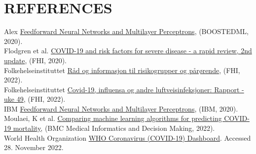 \documentclass[english,notitlepage,reprint,nofootinbib]{revtex4-1}  %
\begin{document}
\section{REFERENCES}\label{sec: REF}
Alex 
\href{https://boostedml.com/2020/04/feedforward-neural-networks-and-multilayer-perceptrons.html}{Feedforward Neural Networks and Multilayer Perceptrons}, (BOOSTEDML, 2020).\label{ref:MLP kilde}
\\
Flodgren et al. \href{https://www.fhi.no/globalassets/dokumenterfiler/rapporter/2020/covid-19-and-risk-factors-for-severe-disease-2nd-update-report-2020.pdf}{COVID-19 and risk factors for severe disease - a rapid review, 2nd update}, (FHI, 2020). \label{ref: FHI risikofaktorer}
\\
Folkehelseinstituttet \href{https://www.fhi.no/nettpub/coronavirus/befolkningen/risikogrupper/}{Råd og informasjon til risikogrupper og pårørende}, (FHI, 2022). \label{ref: FHI risikogrupper 2}
\\
Folkehelseinstituttet \href{https://www.fhi.no/contentassets/8a971e7b0a3c4a06bdbf381ab52e6157/vedlegg/2022/ukerapport-uke-49-05.12--11.12.22.pdf}{Covid-19, influensa og andre luftveisinfeksjoner: Rapport - uke 49}, (FHI, 2022). \label{ref: ukerapport_corona}
\\
IBM 
\href{https://www.ibm.com/cloud/learn/random-forest}{Feedforward Neural Networks and Multilayer Perceptrons}, (IBM, 2020).\label{ref:RandomForest Kilde}
\\
Moulaei, K et al. \href{https://bmcmedinformdecismak.biomedcentral.com/articles/10.1186/s12911-021-01742-0}{Comparing machine learning algorithms for predicting COVID-19 mortality}, (BMC Medical Informatics and Decision Making, 2022). \label{ref: Algorithm comparison}
\\
World Health Organization \href{https://covid19.who.int/}{WHO Coronavirus (COVID-19) Dashboard}. Accessed 28. November 2022. \label{ref: numberOfDeaths}



\end{document}
